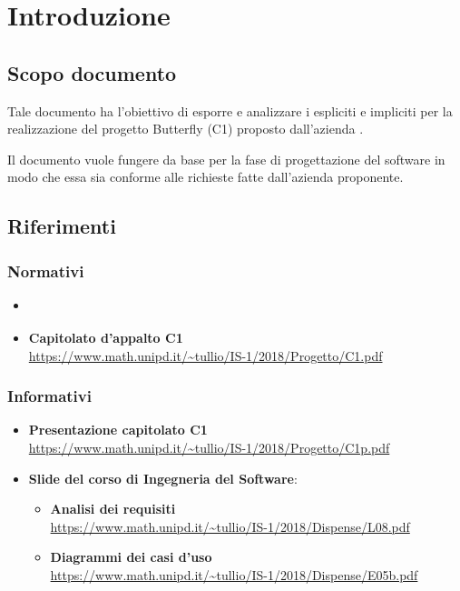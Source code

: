 \section{Introduzione}

	\subsection{Scopo documento}
	Tale documento ha l'obiettivo di esporre e analizzare i  espliciti e impliciti per la realizzazione del progetto Butterfly (C1) proposto dall'azienda \II.

	Il documento vuole fungere da base per la fase di progettazione del software in modo che essa sia conforme alle richieste fatte dall'azienda proponente.

    

    

	\subsection{Riferimenti}

	\subsubsection{Normativi}
	\begin{itemize}
		\item \textbf{\Doc{\NdPv}}
		\item \textbf{Capitolato d'appalto C1}\\
		\url{https://www.math.unipd.it/~tullio/IS-1/2018/Progetto/C1.pdf}
	\end{itemize}

	\subsubsection{Informativi}
	\begin{itemize}
		\item \textbf{Presentazione capitolato C1}\\
		\url{https://www.math.unipd.it/~tullio/IS-1/2018/Progetto/C1p.pdf}
		\item \textbf{Slide del corso di Ingegneria del Software}:
		\begin{itemize}
			\item \textbf{Analisi dei requisiti}\\
			\url{https://www.math.unipd.it/~tullio/IS-1/2018/Dispense/L08.pdf}
			\item \textbf{Diagrammi dei casi d'uso}\\
			\url{https://www.math.unipd.it/~tullio/IS-1/2018/Dispense/E05b.pdf}
		\end{itemize}
	\end{itemize}